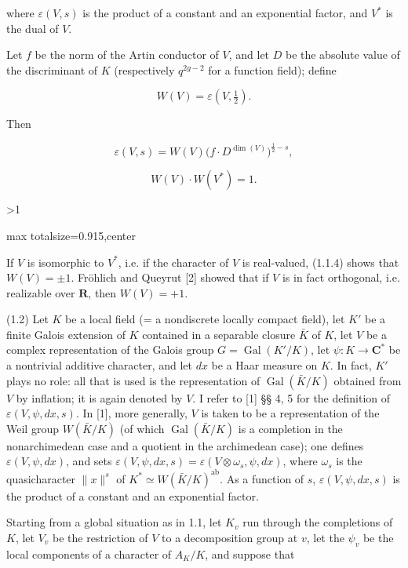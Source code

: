 \documentclass[9pt,twoside]{extarticle}
\newcommand{\EditionPage}[3]{%
  \ifnum#1>1\clearpage\fi
  \pdfbookmark[1]{Printed folio #2}{en-folio-#2}%
  \hypertarget{en-page-#1}{}%
  \noindent\begin{adjustbox}{max totalsize={\textwidth}{0.915\textheight},center}
  \begin{minipage}[t]{\textwidth}
  \fontsize{8.45}{10.05}\selectfont\justifying
  #3
  \end{minipage}
  \end{adjustbox}%
}
\begin{document}
{where \(\varepsilon(V,s)\) is the product of a constant and an exponential factor, and \(V^*\) is the dual of \(V\).\par

Let \(f\) be the norm of the Artin conductor of \(V\), and let \(D\) be the absolute value of the discriminant of \(K\) (respectively \(q^{2g-2}\) for a function field); define\par

\[
\tag{1.1.2} W(V)=\varepsilon\!\left(V,\tfrac12\right).
\]

Then\par

\[
\tag{1.1.3} \varepsilon(V,s)=W(V)\bigl(f\cdot D^{\dim(V)}\bigr)^{\frac12-s},
\]

\[
\tag{1.1.4} W(V)\cdot W(V^*)=1.
\]
}

\EditionPage{2}{300}{%
If \(V\) is isomorphic to \(V^*\), i.e. if the character of \(V\) is real-valued, (1.1.4) shows that \(W(V)=\pm1\). Fröhlich and Queyrut [2] showed that if \(V\) is in fact orthogonal, i.e. realizable over \(\mathbf R\), then \(W(V)=+1\).\par

(1.2) Let \(K\) be a local field (= a nondiscrete locally compact field), let \(K'\) be a finite Galois extension of \(K\) contained in a separable closure \(\bar K\) of \(K\), let \(V\) be a complex representation of the Galois group \(G=\operatorname{Gal}(K'/K)\), let \(\psi:K\to\mathbf C^*\) be a nontrivial additive character, and let \(dx\) be a Haar measure on \(K\). In fact, \(K'\) plays no role: all that is used is the representation of \(\operatorname{Gal}(\bar K/K)\) obtained from \(V\) by inflation; it is again denoted by \(V\). I refer to [1] §§ 4, 5 for the definition of \(\varepsilon(V,\psi,dx,s)\). In [1], more generally, \(V\) is taken to be a representation of the Weil group \(W(\bar K/K)\) (of which \(\operatorname{Gal}(\bar K/K)\) is a completion in the nonarchimedean case and a quotient in the archimedean case); one defines \(\varepsilon(V,\psi,dx)\), and sets \(\varepsilon(V,\psi,dx,s)=\varepsilon(V\otimes\omega_s,\psi,dx)\), where \(\omega_s\) is the quasicharacter \(\lVert x\rVert^s\) of \(K^*\simeq W(\bar K/K)^{\mathrm{ab}}\). As a function of \(s\), \(\varepsilon(V,\psi,dx,s)\) is the product of a constant and an exponential factor.\par

Starting from a global situation as in 1.1, let \(K_v\) run through the completions of \(K\), let \(V_v\) be the restriction of \(V\) to a decomposition group at \(v\), let the \(\psi_v\) be the local components of a character of \(A_K/K\), and suppose that\par

}
\end{document}
